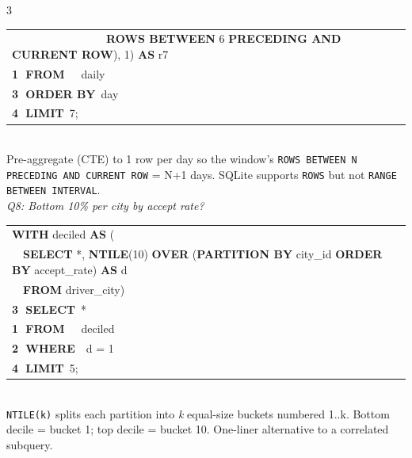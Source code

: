 \documentclass[landscape,letterpaper,9pt]{extarticle}
\begin{document}
\begin{multicols*}{3}
{\begin{minipage}{\dimexpr\linewidth-2pt}
{\begin{tabular}{@{}l@{}}
\textcolor{stepWhere}{~~~~~~~~~~~~~~~~~\textbf{ROWS BETWEEN} 6 \textbf{PRECEDING AND CURRENT ROW}), 1) \textbf{AS} r7} \\
\textcolor{stepFrom}{\textbf{\textcircled{\scriptsize 1} FROM}~~~daily} \\
\textcolor{stepGroup}{\textbf{\textcircled{\scriptsize 3} ORDER BY}~day} \\
\textcolor{stepHaving}{\textbf{\textcircled{\scriptsize 4} LIMIT}~7;} \\
\end{tabular}}
\end{minipage}}
\\[1pt]
\textcolor{cmt}{\scriptsize Pre-aggregate (CTE) to 1 row per day so the window's \texttt{ROWS BETWEEN N PRECEDING AND CURRENT ROW} = N+1 days. SQLite supports \texttt{ROWS} but not \texttt{RANGE BETWEEN INTERVAL}.}\\[3pt]
\textit{\scriptsize Q8: Bottom 10\% per city by accept rate?}\\[1pt]
\colorbox{black!4}{%
\begin{minipage}{\dimexpr\linewidth-2pt}
{\ttfamily\scriptsize
\begin{tabular}{@{}l@{}}
\textbf{WITH} deciled \textbf{AS} ( \\
~~\textbf{SELECT} *, \textbf{NTILE}(10) \textbf{OVER} (\textbf{PARTITION BY} city\_id \textbf{ORDER BY} accept\_rate) \textbf{AS} d \\
~~\textbf{FROM} driver\_city) \\
\textcolor{stepGroup}{\textbf{\textcircled{\scriptsize 3} SELECT}~*} \\
\textcolor{stepFrom}{\textbf{\textcircled{\scriptsize 1} FROM}~~~deciled} \\
\textcolor{stepWhere}{\textbf{\textcircled{\scriptsize 2} WHERE}~~d = 1} \\
\textcolor{stepHaving}{\textbf{\textcircled{\scriptsize 4} LIMIT}~5;} \\
\end{tabular}}
\end{minipage}}
\\[1pt]
\textcolor{cmt}{\scriptsize \texttt{NTILE(k)} splits each partition into \emph{k} equal-size buckets numbered 1..k. Bottom decile = bucket 1; top decile = bucket 10. One-liner alternative to a correlated subquery.}


\end{multicols*}
\end{document}
